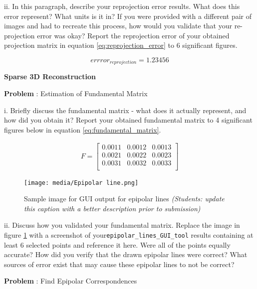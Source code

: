 \documentclass[onecolumn,10pt]{article}
\begin{document}
ii. In this paragraph, describe your reprojection error results. What does this error represent? What units is it in? If you were provided with a different pair of images and had to recreate this process, how would you validate that your re-projection error was okay? Report the reprojection error of your obtained projection matrix in equation \eqref{eq:reprojection_error} to 6 significant figures.


\begin{equation}
errror_{reprojection}=1.23456 \label{eq:reprojection_error}
\end{equation}

\noindent\textbf{Sparse 3D Reconstruction}


\addtocounter{problemnumber}{1}
\noindent\textbf{Problem }:  Estimation of Fundamental Matrix

i. Briefly discuss the fundamental matrix - what does it actually represent, and how did you obtain it? Report your obtained fundamental matrix to 4 significant figures below in equation \ref{eq:fundamental_matrix}.

\begin{align}
F=\begin{bmatrix}
0.0011 & 0.0012 & 0.0013 \\
0.0021 & 0.0022 & 0.0023 \\
0.0031 & 0.0032 & 0.0033 \\
\end{bmatrix}
\label{eq:fundamental_matrix}
\end{align}

\begin{figure}[h]
  \centering
  \texttt{[image: media/Epipolar line.png]}
  \caption{Sample image for GUI output for epipolar lines \textit{(Students: update this caption with a better description prior to submission)}}
  \label{fig:epipolar lines}
\end{figure}

ii. Discuss how you validated your fundamental matrix. Replace the image in figure \ref{fig:epipolar lines} with a screenshot of your{\tt  epipolar\_lines\_GUI\_tool} results containing at least 6 selected points and reference it here. Were all of the points equally accurate? How did you verify that the drawn epipolar lines were correct? What sources of error exist that may cause these epipolar lines to not be correct?



\addtocounter{problemnumber}{1}
\noindent\textbf{Problem }:  Find Epipolar Correspondences
\end{document}
